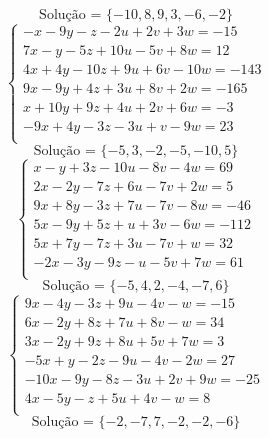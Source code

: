 \documentclass[12pt,oneside,a4paper]{article}
\begin{document}
\begin{equation*}
\text{Solução = }\{-10,8,9,3,-6,-2\}
\end{equation*}
\vspace{\baselineskip}
\begin{equation*}
\begin{cases}
-x-9y-z-2u+2v+3w=-15 \\
7x-y-5z+10u-5v+8w=12 \\
4x+4y-10z+9u+6v-10w=-143 \\
9x-9y+4z+3u+8v+2w=-165 \\
x+10y+9z+4u+2v+6w=-3 \\
-9x+4y-3z-3u+v-9w=23 \\
\end{cases}
\end{equation*}
\begin{equation*}
\text{Solução = }\{-5,3,-2,-5,-10,5\}
\end{equation*}
\vspace{\baselineskip}
\begin{equation*}
\begin{cases}
x-y+3z-10u-8v-4w=69 \\
2x-2y-7z+6u-7v+2w=5 \\
9x+8y-3z+7u-7v-8w=-46 \\
5x-9y+5z+u+3v-6w=-112 \\
5x+7y-7z+3u-7v+w=32 \\
-2x-3y-9z-u-5v+7w=61 \\
\end{cases}
\end{equation*}
\begin{equation*}
\text{Solução = }\{-5,4,2,-4,-7,6\}
\end{equation*}
\vspace{\baselineskip}
\begin{equation*}
\begin{cases}
9x-4y-3z+9u-4v-w=-15 \\
6x-2y+8z+7u+8v-w=34 \\
3x-2y+9z+8u+5v+7w=3 \\
-5x+y-2z-9u-4v-2w=27 \\
-10x-9y-8z-3u+2v+9w=-25 \\
4x-5y-z+5u+4v-w=8 \\
\end{cases}
\end{equation*}
\begin{equation*}
\text{Solução = }\{-2,-7,7,-2,-2,-6\}
\end{equation*}
\end{document}
